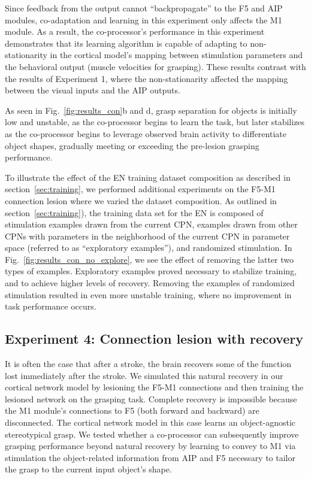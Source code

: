 \documentclass[12pt]{iopart}
\begin{document}
Since feedback from the output cannot ``backpropagate'' to the F5 and AIP modules, co-adaptation and
learning in this experiment only affects the M1 module. As a result, the co-processor's performance in
this experiment demonstrates that its learning algorithm is capable of adapting to non-stationarity
in the cortical model's mapping between stimulation parameters and the behavioral output (muscle velocities
for grasping). These results contrast  with the results of Experiment 1, where the non-stationarity affected
the mapping between the visual inputs and the AIP outputs.

As seen in Fig.~\ref{fig:results_con}b and d, grasp separation for objects is initially low and unstable,
as the co-processor begins to learn the task, but later stabilizes as the co-processor begins to
leverage observed brain activity to differentiate object shapes, gradually meeting or exceeding the
pre-lesion grasping performance.

To illustrate the effect of the EN training dataset composition as described in section~\ref{sec:training}, we
performed additional experiments on the F5-M1 connection lesion where we varied the dataset composition. As
outlined in section~\ref{sec:training}), the training data set for the EN is composed of stimulation examples
drawn from the current CPN, examples drawn from other CPNs with parameters in the neighborhood of the current
CPN in parameter space (referred to as ``exploratory examples''), and randomized stimulation. In
Fig.~\ref{fig:results_con_no_explore}, we see the effect of removing the latter two types of examples.
Exploratory examples proved necessary to stabilize training, and to achieve higher levels of recovery. Removing
the examples of randomized stimulation resulted in even more unstable training, where no improvement in task
performance occurs.

\subsection{Experiment 4: Connection lesion with recovery}
It is often the case that after a stroke, the brain recovers some of the function lost immediately after the
stroke. We simulated this natural recovery in our cortical  network model by lesioning the F5-M1 connections
and then training the lesioned network on the grasping task. Complete recovery is impossible because the M1 module's
connections to F5 (both forward and backward) are disconnected. The cortical network model in this case learns
an object-agnostic stereotypical grasp. We tested whether a co-processor can subsequently improve grasping performance
beyond natural recovery by learning to convey to M1 via stimulation the object-related information from AIP and F5
necessary to tailor the grasp to the current input object's shape.
\end{document}
